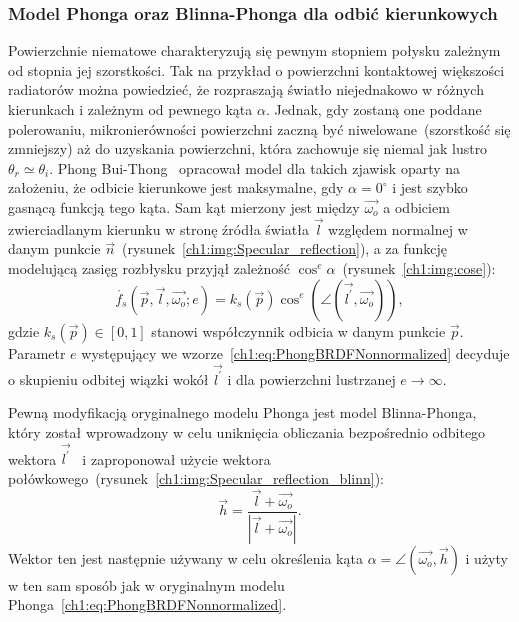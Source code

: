 \subsubsection{Model Phonga oraz Blinna-Phonga dla odbić kierunkowych}
Powierzchnie niematowe charakteryzują się pewnym stopniem połysku zależnym od stopnia jej szorstkości. Tak na przykład o powierzchni kontaktowej większości radiatorów można powiedzieć, że rozpraszają światło niejednakowo w różnych kierunkach i zależnym od pewnego kąta $\alpha$. Jednak, gdy zostaną one poddane polerowaniu, mikronierówności powierzchni zaczną być niwelowane~(szorstkość się zmniejszy) aż do uzyskania powierzchni, która zachowuje się niemal jak lustro $\theta_r \simeq \theta_i$. Phong Bui-Thong~\cite{Phong} opracował model dla takich zjawisk oparty na założeniu, że odbicie kierunkowe jest maksymalne, gdy $\alpha = 0^\circ$ i jest szybko gasnącą funkcją tego kąta. Sam kąt mierzony jest między $\vec{\omega_o}$ a odbiciem zwierciadlanym kierunku w stronę źródła światła $\vec{l}$ względem normalnej w danym punkcie $\vec{n}$~(rysunek~\ref{ch1:img:Specular_reflection}), a za funkcję modelującą zasięg rozbłysku przyjął zależność $\cos^e\alpha$~(rysunek~\ref{ch1:img:cose}):
\begin{equation}
\acute{f_s}(\vec{p}, \vec{l}, \vec{\omega_o}; e) = k_s(\vec{p})\cos^e\left(\angle(\vec{l^\prime}, \vec{\omega_o})\right),
\label{ch1:eq:PhongBRDFNonnormalized}
\end{equation}
gdzie $k_s(\vec{p})\in[0, 1]$ stanowi współczynnik odbicia w danym punkcie $\vec{p}$.
Parametr $e$ występujący we wzorze~\eqref{ch1:eq:PhongBRDFNonnormalized} decyduje o skupieniu odbitej wiązki wokół $\vec{l^\prime}$ i dla powierzchni lustrzanej $e\rightarrow\infty$.

Pewną modyfikacją oryginalnego modelu Phonga jest model Blinna-Phonga, który został wprowadzony w celu uniknięcia obliczania bezpośrednio odbitego wektora $\vec{l^\prime}$~\cite{BlinnPhong} i zaproponował użycie wektora połówkowego~(rysunek~\ref{ch1:img:Specular_reflection_blinn}):
\begin{equation}
\vec{h} = \frac{\vec{l} + \vec{\omega_o}}{|\vec{l} + \vec{\omega_o}|}.
\end{equation}
Wektor ten jest następnie używany w celu określenia kąta $\alpha = \angle(\vec{\omega_o}, \vec{h})$ i użyty w ten sam sposób jak w oryginalnym modelu Phonga~\eqref{ch1:eq:PhongBRDFNonnormalized}.


